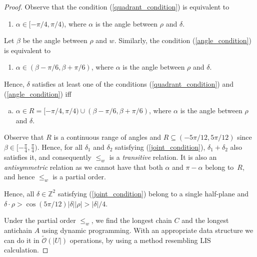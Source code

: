 \documentclass[11pt, letterpaper]{article}
\theoremstyle{plain}
\theoremstyle{definition}
\theoremstyle{remark}
\newcommand{\Z}{\mathbb{Z}}
\newcommand{\tO}{\tilde{\mathcal{O}}}
\begin{document}
\begin{proof}
Observe that the condition (\ref{quadrant_condition}) is equivalent to

\begin{enumerate}[(a')]
	\item $\alpha \in [-\pi / 4, \pi / 4)$, where $\alpha$ is the angle between $\rho$ and $\delta$.
\end{enumerate}

Let $\beta$ be the angle between $\rho$ and $w$. Similarly, the condition (\ref{angle_condition}) is equivalent to
\begin{enumerate}[(b')]
	\item $\alpha \in (\beta - \pi / 6, \beta + \pi / 6)$, where $\alpha$ is the angle between $\rho$ and $\delta$. 
\end{enumerate}

Hence, $\delta$ satisfies at least one of the conditions (\ref{quadrant_condition}) and (\ref{angle_condition}) iff 

\begin{enumerate}[(c)]
	\item $\alpha \in R = [-\pi / 4, \pi / 4) \cup (\beta - \pi / 6, \beta + \pi / 6)$, where $\alpha$ is the angle between $\rho$ and $\delta$. \label{joint_condition}
\end{enumerate}

Observe that $R$ is a continuous range of angles and $R \subseteq (-5 \pi / 12, 5 \pi / 12)$ since $\beta \in [-\frac{\pi}{4}, \frac{\pi}{4})$.  Hence, for all $\delta_1$ and $\delta_2$ satisfying (\ref{joint_condition}), $\delta_1 + \delta_2$ also satisfies it, and consequently $\le_w$ is a \emph{transitive} relation. It is also an \emph{antisymmetric} relation as we cannot have that both $\alpha$ and $\pi-\alpha$ belong to~$R$, and hence  $\le_w$ is a partial order.

Hence, all $\delta \in \Z^2$ satisfying (\ref{joint_condition}) belong to a single half-plane and $\delta \cdot \rho > \cos(5\pi / 12)|\delta||\rho| > |\delta| / 4$.

Under the partial order $\le_w$, we find the longest chain $C$ and the longest antichain $A$ using dynamic programming.
With an appropriate data structure we can do it in $\tO(|U|)$ operations, by using a method resembling LIS calculation. 


\end{proof}
\end{document}
